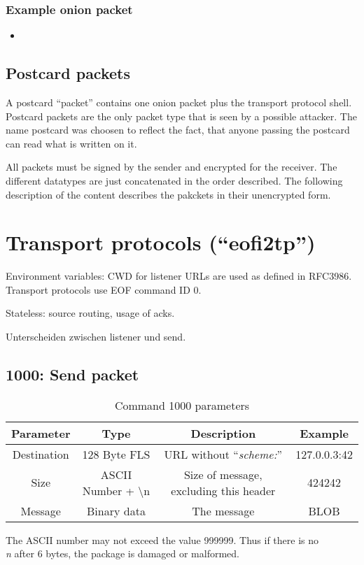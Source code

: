\documentclass[12pt,a4paper]{book}
\begin{document}
\subsubsection{Example onion packet}
\begin{itemize}
\item 
\end{itemize}
\subsection{Postcard packets}
A postcard "`packet"' contains one onion packet plus the transport protocol
shell.  Postcard packets are the only packet type that is seen by a possible
attacker.  The name postcard was choosen to reflect the fact, that anyone
passing the postcard can read what is written on it.

All packets must be signed by the sender and encrypted for the receiver.
The different datatypes are just concatenated in the order described.
The following description of the content describes the pakckets
in their unencrypted form.

\section{Transport protocols ("`eofi2tp"')}
\label{tp}
Environment variables: CWD for listener
URLs are used as defined in RFC3986\cite{uri-1}.
Transport protocols use EOF command ID 0.

Stateless: source routing, usage of acks.

Unterscheiden zwischen listener und send.
\subsection{1000: Send packet}
\begin{longtable}{|c|c|c|c|}
\caption{Command 1000 parameters}\\
\hline
\textbf{Parameter} & \textbf{Type} & \textbf{Description} & \textbf{Example}\\
\hline
Destination & 128 Byte FLS &URL without "`\emph{scheme:}"' & 127.0.0.3:42\\
\hline
Size & ASCII Number + \textbackslash{}n & Size of message, excluding this header & 424242\\
\hline
Message & Binary data & The message & BLOB\\
\hline
\end{longtable}
The ASCII number may not exceed the value 999999. Thus if there is no
\emph{\\n} after 6 bytes, the package is damaged or malformed.
\end{document}
